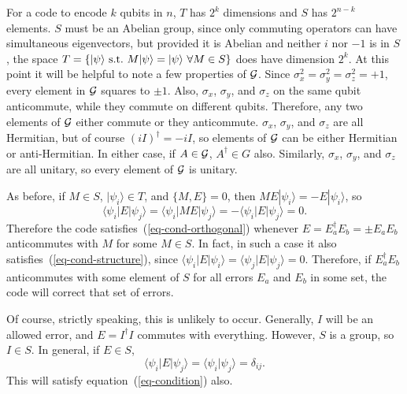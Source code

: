 \documentclass{report}
\newcommand{\G}{{\cal G}}
\newcommand{\ket}[1]{|{#1}\rangle}
\newcommand{\bra}[1]{\langle{#1}|}
\newcommand{\X}{\sigma_x}
\newcommand{\Z}{\sigma_z}
\newcommand{\Y}{\sigma_y}
\begin{document}
For a code to encode $k$ qubits in $n$, $T$ has $2^k$ dimensions and $S$ 
has $2^{n-k}$ elements.  $S$ must be an Abelian group, since only 
commuting operators can have simultaneous eigenvectors, but provided it 
is Abelian and neither $i$ nor $-1$ is in $S$, the space $T = \{ \ket{\psi}\ 
{\rm s.t.} \ M \ket{\psi} = \ket{\psi} \ \forall M \in S \}$ does have 
dimension $2^k$.  At this point it will be helpful to note a few properties of 
$\G$.  Since $\X^2 = \Y^2 = \Z^2 = +1$, every element in $\G$ squares to 
$\pm 1$.  Also, $\X$, $\Y$, and $\Z$ on the same qubit anticommute, while 
they commute on different qubits.  Therefore, any two elements of $\G$ 
either commute or they anticommute.  $\X$, $\Y$, and $\Z$ are all 
Hermitian, but of course $(iI)^\dagger = -i I$, so elements of $\G$ can be 
either Hermitian or anti-Hermitian.  In either case, if $A \in \G$, 
$A^\dagger \in G$ also.  Similarly, $\X$, $\Y$, and $\Z$ are all unitary, so 
every element of $\G$ is unitary.

As before, if $M \in S$, $\ket{\psi_i} \in T$, and $\{M, E \} = 0$, then
$M E \ket{\psi_i} =- E \ket{\psi_i}$, so
\begin{equation}
\bra{\psi_i} E \ket{\psi_j} = \bra{\psi_i} M E \ket{\psi_j} = - \bra{\psi_i} E 
\ket{\psi_j} = 0.
\end{equation}
Therefore the code satisfies~(\ref{eq-cond-orthogonal}) whenever $E = 
E_a^\dagger E_b = \pm E_a E_b$ anticommutes with $M$ for some $M \in 
S$.  In fact, in such a case it also satisfies~(\ref{eq-cond-structure}), since 
$\bra{\psi_i} E \ket{\psi_i} = \bra{\psi_j} E \ket{\psi_j} = 0$.  Therefore, if 
$E_a^\dagger E_b$ anticommutes with some element of $S$ for all errors 
$E_a$ and $E_b$ in some set, the code will correct that set of errors.

Of course, strictly speaking, this is unlikely to occur.  Generally, $I$ will 
be an allowed error, and $E = I^\dagger I$ commutes with everything.  
However, $S$ is a group, so $I \in S$.  In general, if $E \in S$,
\begin{equation}
\bra{\psi_i} E \ket{\psi_j} = \langle \psi_i \ket{\psi_j} = \delta_{ij}.
\end{equation}
This will satisfy equation~(\ref{eq-condition}) also.
\end{document}
